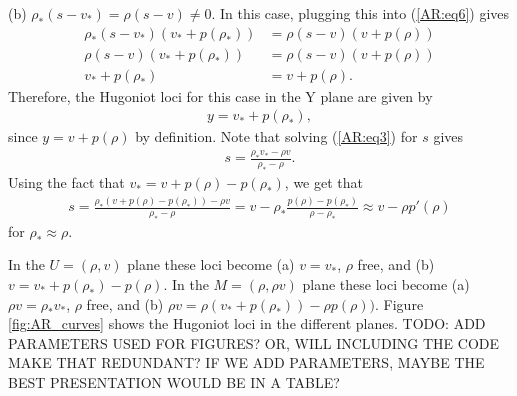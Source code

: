 \documentclass{article}
\begin{document}
(b) $\rho_*(s - v_*) = \rho (s - v) \neq 0$. In this case, plugging this into (\ref{AR:eq6}) gives
\begin{align*}
\rho_*(s - v_*)\left(v_* + p(\rho_* )\right) &= \rho(s - v)\left(v + p(\rho )\right)\\
\rho(s - v)\left(v_* + p(\rho_* )\right) &= \rho(s - v)\left(v + p(\rho )\right)\\
v_* + p(\rho_* )&= v + p(\rho ).
\end{align*}
Therefore, the Hugoniot loci for this case in the Y plane are given by
\begin{align*}
y = v_* + p(\rho_* ),
\end{align*}
since $y = v + p(\rho )$ by definition. Note that solving (\ref{AR:eq3}) for $s$ gives
\begin{align*}
s = \frac{\rho_*v_* - \rho v}{\rho_* - \rho}.
\end{align*}
Using the fact that $v_* = v + p(\rho) - p(\rho_*)$, we get that
\begin{align*}
s = \frac{\rho_*\left( v + p(\rho) - p(\rho_*)\right)- \rho v}{\rho_* - \rho}
= v - \rho_*\frac{p(\rho ) - p(\rho_*)}{\rho - \rho_*}
\approx v - \rho p'(\rho)
\end{align*}
for $\rho_* \approx \rho$. 

In the $U = (\rho, v)$ plane these loci become (a) $v = v_*$, $\rho$ free, and (b) $v = v_* + p(\rho_* ) - p(\rho )$.
 In the $M = (\rho, \rho v)$ plane these loci become (a) $\rho v = \rho_* v_*$, $\rho$ free, 
 and (b) $\rho v = \rho \left( v_* + p(\rho_*)\right) - \rho p(\rho))$. Figure \ref{fig:AR_curves} shows the Hugoniot loci 
 in the different planes. TODO: ADD PARAMETERS USED FOR FIGURES? OR, WILL INCLUDING THE CODE MAKE THAT REDUNDANT? 
 IF WE ADD PARAMETERS, MAYBE THE BEST PRESENTATION WOULD BE IN A TABLE?
\end{document}
